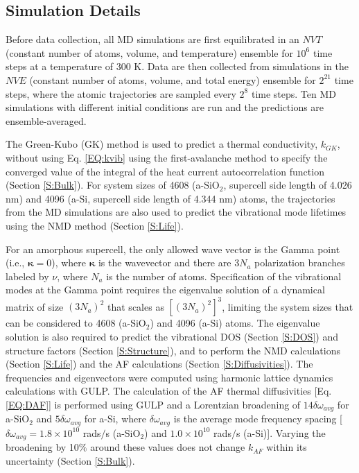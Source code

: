 \documentclass[aps,prb,onecolumn,preprint,superscriptaddress,footinbib,amsmath,amssymb,floatfix]{revtex4}
\begin{document}
\subsection{\label{S:Simulation}Simulation Details}

Before data collection, all MD simulations are first equilibrated in an 
$NVT$ (constant number of atoms, volume, and temperature) ensemble for 
$10^6$ time steps at a temperature of 300 K. Data are then collected from 
simulations in the $NVE$ (constant number of atoms, volume, and total
energy) ensemble 
for $2^{21}$ time steps, where the atomic trajectories are sampled 
every $2^{8}$ time steps. Ten MD simulations with different initial 
conditions are run and the predictions are ensemble-averaged. 

The Green-Kubo (GK) method\cite{mcquarrie_statistical_2000} 
is used to predict a thermal conductivity, $k_{GK}$, 
without using Eq. \eqref{EQ:kvib} using the 
first-avalanche method to specify the converged value of the integral 
of the heat current autocorrelation function (Section \ref{S:Bulk}).
\cite{chen_how_2010} 
For system sizes of 4608 (a-SiO$_2$, supercell side length of 4.026 nm) 
and 4096 (a-Si, supercell side length of 4.344 nm) atoms, 
the trajectories from the MD simulations are also used to predict 
the vibrational mode lifetimes using the NMD method 
(Section \ref{S:Life}). 

For an amorphous supercell, 
the only allowed wave vector is the Gamma point 
(i.e., $\pmb{\kappa}=0$),  
where $\pmb{\kappa}$ is the wavevector and there are $3N_a$ 
polarization 
branches labeled by $\nu$, where $N_a$ is the number of atoms. 
Specification of the vibrational modes at the Gamma point  
requires the eigenvalue solution of a dynamical matrix of size 
$(3N_a)^2$ that scales as $[(3N_a)^2]^3$, limiting the system 
sizes that can be considered to 4608 (a-SiO$_2$) and 4096 (a-Si) 
atoms. 
The eigenvalue solution is also required to predict the vibrational 
DOS (Section \ref{S:DOS}) and structure factors 
(Section \ref{S:Structure}), and to perform the NMD calculations  
(Section \ref{S:Life})  
and the AF calculations (Section \ref{S:Diffusivities}). 
The frequencies and eigenvectors were computed using harmonic
lattice dynamics calculations with GULP.\cite{gale_general_2003} 
The calculation of the AF thermal diffusivities 
[Eq. \eqref{EQ:DAF}] is performed using GULP and a Lorentzian 
broadening of $14\delta\omega_{avg}$ for a-SiO$_2$ and 
$5\delta\omega_{avg}$ for a-Si, 
where $\delta\omega_{avg}$ is the average mode 
frequency spacing 
[$\delta\omega_{avg} = 1.8 \times 10^{10}$ rads$/$s (a-SiO$_2$) 
and $1.0 \times 10^{10}$ rads$/$s (a-Si)].   
Varying the broadening by 10$\%$ around these values does not 
change $k_{AF}$ within its uncertainty 
(Section \ref{S:Bulk}).
\end{document}
